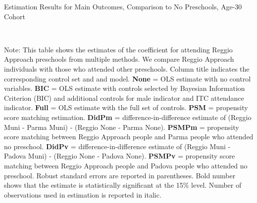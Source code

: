 \begin{table}[H] \caption{Estimation Results for Main Outcomes, Comparison to No Preschools, Age-30 Cohort} \label{ols-M-adult30-reg-nopres}
\scalebox{0.65}{}
\vspace{1ex} \\
\footnotesize\raggedright{Note: This table shows the estimates of the coefficient for attending Reggio Approach preschools from multiple methods. We compare Reggio Approach individuals with those who attended other preschools. Column title indicates the corresponding control set and and model. \textbf{None} = OLS estimate with no control variables. \textbf{BIC} = OLS estimate with controls selected by Bayesian Information Criterion (BIC) and additional controls for male indicator and ITC attendance indicator. \textbf{Full} = OLS estimate with the full set of controls. \textbf{PSM} =  propensity score matching estimation. \textbf{DidPm} = difference-in-difference estimate of (Reggio Muni - Parma Muni) - (Reggio None - Parma None). \textbf{PSMPm} = propensity score matching between Reggio Approach people and Parma people who attended no preschool. \textbf{DidPv} = difference-in-difference estimate of (Reggio Muni - Padova Muni) - (Reggio None - Padova None). \textbf{PSMPv} = propensity score matching between Reggio Approach people and Padova people who attended no preschool. Robust standard errors are reported in parentheses. Bold number shows that the estimate is statistically significant at the 15\% level. Number of observations used in estimation is reported in italic.}
\end{table}


